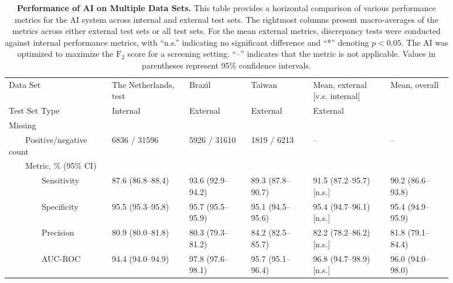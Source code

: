\begin{table}[!h]
\centering\caption{  \textbf{Performance of AI on Multiple Data Sets.}   This table provides a horizontal comparison of various performance metrics for the AI system across internal and external test sets.   The rightmost columns present macro-averages of the metrics across either external test sets or all test sets.  For the mean external metrics, discrepancy tests were conducted against internal performance metrics, with ``n.s.'' indicating no significant difference and ``*'' denoting $p<0.05$.  The AI was optimized to maximize the $\textrm{F}_2$ score for a screening setting.  ``--'' indicates that the metric is not applicable.  Values in parentheses represent 95\% confidence intervals. }\label{tbl:ai-multinational-short}\scriptsize{}
\begin{tabular}{ p{0.2\linewidth}p{0.15\linewidth}p{0.125\linewidth}p{0.125\linewidth}|p{0.15\linewidth}p{0.125\linewidth} }
\toprule
Data Set & The Netherlands, test & Brazil & Taiwan & Mean, external [v.s. internal] & Mean, overall \\
Test Set Type & Internal & External & External & External &   \\ \midrule
Missing &   &   &   &   &   \\
{~~~~}Positive/negative count & \num{6836} / \num{31596} & \num{5926} / \num{31610} & \num{1819} / \num{6213} & -- & -- \\
{~~~~}Metric, \% (95\% CI) &   &   &   &   &   \\
{~~~~~~~~}Sensitivity & 87.6 {(86.8--88.4)} & 93.6 {(92.9--94.2)} & 89.3 {(87.8--90.7)} & 91.5 (87.2--95.7) [n.s.] & 90.2 (86.6--93.8) \\
{~~~~~~~~}Specificity & 95.5 {(95.3--95.8)} & 95.7 {(95.5--95.9)} & 95.1 {(94.5--95.6)} & 95.4 (94.7--96.1) [n.s.] & 95.4 (94.9--95.9) \\
{~~~~~~~~}Precision & 80.9 {(80.0--81.8)} & 80.3 {(79.3--81.2)} & 84.2 {(82.5--85.7)} & 82.2 (78.2--86.2) [n.s.] & 81.8 (79.1--84.4) \\
{~~~~~~~~}AUC-ROC & 94.4 {(94.0--94.9)} & 97.8 {(97.6--98.1)} & 95.7 {(95.1--96.4)} & 96.8 (94.7--98.9) [n.s.] & 96.0 (94.0--98.0) \\ \midrule


\end{tabular}
\end{table}
